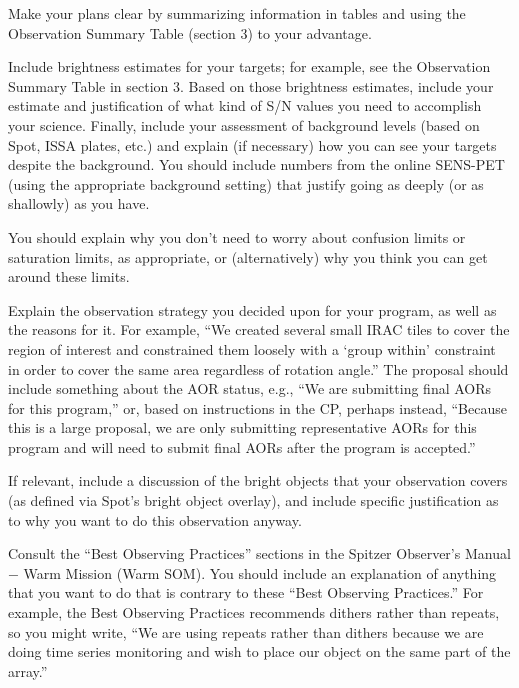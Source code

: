 \documentclass[letterpaper,12pt]{article}
\begin{document}
Make your plans clear by summarizing information in tables
and using the Observation Summary Table (section 3) to your advantage.\newline

Include brightness estimates 
for your targets; for example, see the Observation Summary Table
in section 3.  Based on those brightness estimates, include
your estimate and justification of what kind of S/N values you
need to accomplish your science.  Finally, include your
assessment of background levels (based on Spot, ISSA plates,
etc.) and explain (if necessary) how you can see your targets
despite the background. You should include numbers from the 
online SENS-PET (using the appropriate background setting) 
that justify going as deeply (or as shallowly) as you have.\newline

You should explain why you don't need to worry
about confusion limits or saturation limits, as appropriate, or
(alternatively) why you think you can get around these limits.\newline

Explain the observation strategy you decided upon for your
program, as well as the reasons for it.  For example, ``We
created several small IRAC tiles to cover the region of
interest and constrained them loosely with a `group within'
constraint in order to cover the same area regardless of
rotation angle.''  The proposal should include something about
the AOR status, e.g., ``We are submitting final AORs for this
program,''  or, based on instructions in the CP, perhaps
instead, ``Because this is a large proposal, we are only
submitting representative AORs for this program and will need to
submit final AORs after the program is accepted.'' \newline

If relevant, include a discussion of the bright objects that
your observation covers (as defined via Spot's bright object
overlay), and include specific justification as to why you
want to do this observation anyway.\newline

Consult the ``Best Observing
Practices'' sections in the Spitzer Observer's Manual $-$ Warm Mission
(Warm SOM). You should include an explanation of anything that you 
want to do that is contrary to these ``Best Observing Practices.''  For
example, the Best Observing Practices recommends dithers rather
than repeats, so you might write, ``We are using 
repeats rather than dithers because we are doing time series
monitoring and wish to place our object on the same part of the
array.''\newline
\end{document}
